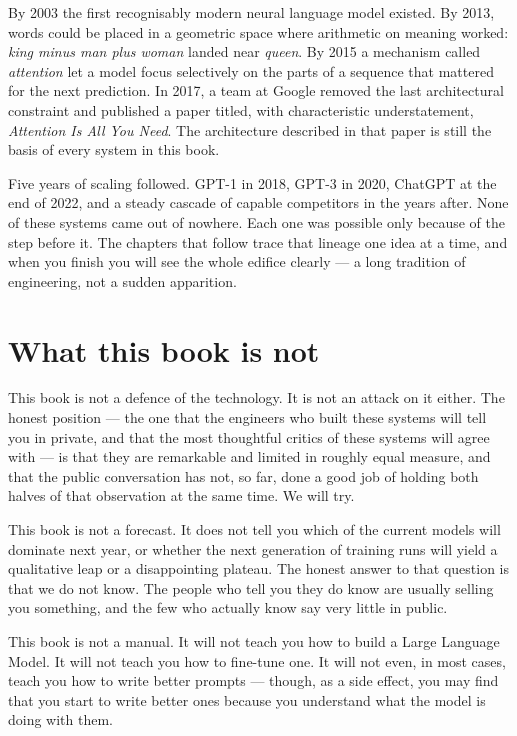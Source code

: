 By 2003 the first recognisably modern neural language model
existed. By 2013, words could be placed in a geometric space
where arithmetic on meaning worked: \emph{king minus man plus
woman} landed near \emph{queen}. By 2015 a mechanism called
\emph{attention} let a model focus selectively on the parts of
a sequence that mattered for the next prediction. In 2017, a
team at Google removed the last architectural constraint and
published a paper titled, with characteristic understatement,
\emph{Attention Is All You Need}. The architecture described
in that paper is still the basis of every system in this book.

Five years of scaling followed. GPT-1 in 2018, GPT-3 in 2020,
ChatGPT at the end of 2022, and a steady cascade of capable
competitors in the years after. None of these systems came out
of nowhere. Each one was possible only because of the step
before it. The chapters that follow trace that lineage one idea
at a time, and when you finish you will see the whole edifice
clearly --- a long tradition of engineering, not a sudden
apparition.

\section*{What this book is not}

This book is not a defence of the technology. It is not an
attack on it either. The honest position --- the one that the
engineers who built these systems will tell you in private, and
that the most thoughtful critics of these systems will agree
with --- is that they are remarkable and limited in roughly equal
measure, and that the public conversation has not, so far, done a
good job of holding both halves of that observation at the same
time. We will try.

This book is not a forecast. It does not tell you which of the
current models will dominate next year, or whether the next
generation of training runs will yield a qualitative leap or a
disappointing plateau. The honest answer to that question is that
we do not know. The people who tell you they do know are usually
selling you something, and the few who actually know say very
little in public.

This book is not a manual. It will not teach you how to build a
Large Language Model. It will not teach you how to fine-tune one.
It will not even, in most cases, teach you how to write better
prompts --- though, as a side effect, you may find that you start
to write better ones because you understand what the model is
doing with them.

